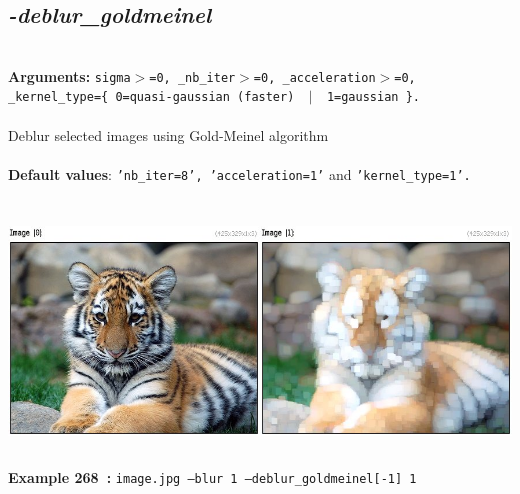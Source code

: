 \documentclass[a4paper,11pt,twoside]{book}
\begin{document}
\subsection{\emph{-deblur\_goldmeinel} }\vspace*{-0.5em}
~\\\textbf{Arguments: } 
{\small \texttt{sigma$>$=0, \_nb\_iter$>$=0, \_acceleration$>$=0, \_kernel\_type=\{ 0=quasi-gaussian (faster) ~$|$~ 1=gaussian \}.}}\\~\\
Deblur selected images using Gold-Meinel algorithm
~\\~\\\textbf{Default values}: {\small \texttt{'nb\_iter=8', 'acceleration=1'} and \texttt{'kernel\_type=1'.}}
\begin{center}\includegraphics[keepaspectratio=true,height=7cm,width=\textwidth]{img/gmic_def268.jpg}\\
{\footnotesize \textbf{Example 268~:} \texttt{image.jpg --blur 1 --deblur\_goldmeinel[-1] 1}}
\end{center}
\end{document}
